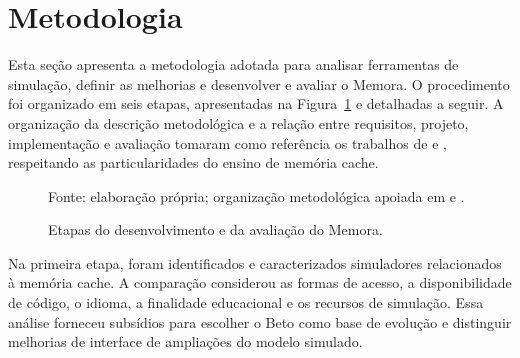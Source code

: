 \section{Metodologia}
\label{sec:metodo}

Esta seção apresenta a metodologia adotada para analisar ferramentas de simulação, definir as melhorias e desenvolver e avaliar o Memora. O procedimento foi organizado em seis etapas, apresentadas na Figura~\ref{fig:etapas-metodo} e detalhadas a seguir. A organização da descrição metodológica e a relação entre requisitos, projeto, implementação e avaliação tomaram como referência os trabalhos de  e , respeitando as particularidades do ensino de memória cache.

\begin{figure}[!htbp]
\centering
{}
\caption{Etapas do desenvolvimento e da avaliação do Memora.}
\label{fig:etapas-metodo}
\par\footnotesize Fonte: elaboração própria; organização metodológica apoiada em  e .
\end{figure}

Na primeira etapa, foram identificados e caracterizados simuladores relacionados à memória cache. A comparação considerou as formas de acesso, a disponibilidade de código, o idioma, a finalidade educacional e os recursos de simulação. Essa análise forneceu subsídios para escolher o Beto como base de evolução e distinguir melhorias de interface de ampliações do modelo simulado.

